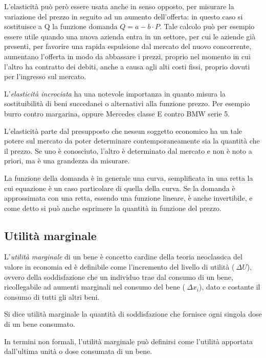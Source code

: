 L'elasticità può però essere usata anche in senso opposto, per misurare la 
variazione del prezzo in seguito ad un aumento dell'offerta: in questo caso si 
sostituisce a Q la funzione domanda \(Q = a - b \cdot P\). Tale calcolo 
può per esempio essere utile quando una nuova azienda entra in un settore, per 
cui le aziende già presenti, per favorire una rapida espulsione dal mercato del 
nuovo concorrente, aumentano l'offerta in modo da abbassare i prezzi, proprio 
nel momento in cui l'altro ha contratto dei debiti, anche a causa agli alti 
costi fissi, proprio dovuti per l'ingresso sul mercato.

L'\emph{elasticità incrociata} ha una notevole importanza in quanto misura la 
sostituibilità di beni succedanei o alternativi alla funzione 
prezzo. Per esempio burro contro margarina, oppure Mercedes classe E contro 
BMW serie 5.

L'elasticità parte dal presupposto che nessun soggetto economico ha un tale 
potere sul mercato da poter determinare contemporaneamente sia la quantità che 
il prezzo. Se uno è conosciuto, l'altro è determinato dal mercato e non è noto 
a priori, ma è una grandezza da misurare.

La funzione della domanda è in generale una curva, 
semplificata in una retta la cui equazione è un caso particolare 
di quella della curva. Se la domanda è approssimata con una retta, 
essendo una funzione lineare, è anche invertibile, e come detto si può 
anche esprimere la quantità in funzione del prezzo.

\subsection{Utilità marginale}

L'\emph{utilità marginale} di un bene è concetto cardine della teoria 
neoclassica del valore in economia ed è definibile come 
l'incremento del livello di utilità (\(\ \Delta U\)), ovvero della 
soddisfazione che un individuo trae dal consumo di un bene, ricollegabile ad 
aumenti marginali nel consumo del bene (\(\ \Delta x_i\)), dato e 
costante il consumo di tutti gli altri beni.

\begin{definizione}
Si dice utilità marginale la quantità di soddisfazione che fornisce ogni 
singola dose di un bene consumato.
\end{definizione}

In termini non formali, l'utilità marginale può definirsi come l'utilità 
apportata dall'ultima unità o dose consumata di un bene.

